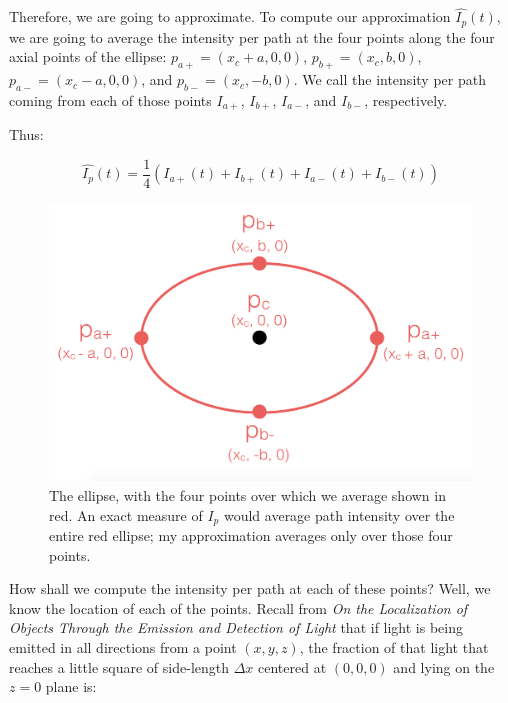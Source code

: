 \documentclass[11pt]{article}
\begin{document}
Therefore, we are going to approximate. To compute our approximation $\hat{I_p}(t)$, we are going to average the intensity per path at the four points along the four axial points of the ellipse: $p_{a+} = (x_c + a, 0, 0)$, $p_{b+} = (x_c, b, 0)$, $p_{a-} = (x_c - a, 0, 0)$, and $p_{b-} = (x_c, -b, 0)$. We call the intensity per path coming from each of those points $I_{a+}$, $I_{b+}$, $I_{a-}$, and $I_{b-}$, respectively.

Thus: 

\begin{equation}
    \hat{I_p}(t) = \frac{1}{4}\left(I_{a+}(t) + I_{b+}(t) + I_{a-}(t) + I_{b-}(t)\right)
\end{equation}

\begin{figure}
\begin{center}
\centering
\includegraphics[scale=0.4]{figs/fourpoints.png}
\caption{The ellipse, with the four points over which we average shown in red. An exact measure of $I_p$ would average path intensity over the entire red ellipse; my approximation averages only over those four points. \label{fig:fourpoints}}
\end{center}
\end{figure}

How shall we compute the intensity per path at each of these points? Well, we know the location of each of the points. Recall from \emph{On the Localization of Objects Through the Emission and Detection of Light} that if light is being emitted in all directions from a point $(x, y, z)$, the fraction of that light that reaches a little square of side-length $\Delta x$ centered at $(0,0,0)$ and lying on the $z=0$ plane is: 
\end{document}

